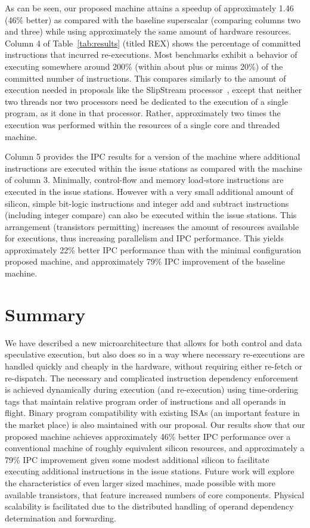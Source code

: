 \documentclass[10pt,twocolumn,dvips]{article}
\begin{document}
%
As can be seen, our proposed machine attains a speedup of approximately
1.46 (46\% better) as compared with the baseline superscalar 
(comparing columns two and three) 
while using approximately the same amount of hardware resources.
Column 4 of Table~\ref{tab:results} (titled REX) shows the percentage
of committed instructions that incurred re-executions.
Most benchmarks exhibit a behavior of executing somewhere around
200\% (within about plus or minus 20\%) of the committed
number of instructions.
This compares similarly to the amount of execution needed
in proposals like the SlipStream processor~\cite{ibrahim03},
except that neither two threads nor two processors need be
dedicated to the execution of a single program, as it done in
that processor. 
Rather, approximately two times the execution was performed
within the resources of a single core and threaded machine.

Column 5 provides the IPC results for a version of the
machine where additional instructions are executed within
the issue stations as compared with the machine of column 3.
Minimally, control-flow and memory load-store instructions
are executed in the issue stations.  
However with a very small additional amount of silicon,
simple bit-logic instructions and integer add and subtract
instructions (including integer compare) can also 
be executed within the issue stations.
This arrangement (transistors permitting) increases the
amount of resources available for executions, thus increasing
parallelism and IPC performance.
This yields approximately 22\% better IPC performance
than with the minimal configuration proposed machine, and approximately
79\% IPC improvement of the baseline machine.
%
%
\vspace{-0.15in}
\section{Summary}
%
We have described a new microarchitecture that
allows for both control and data speculative execution,
but also does so 
in a way where necessary re-executions are handled
quickly and cheaply in the hardware, without requiring either
re-fetch or re-dispatch.  
The necessary and complicated instruction dependency
enforcement is achieved dynamically during execution (and re-execution)
using time-ordering tags that maintain relative program order
of instructions and all operands in flight.
Binary program compatibility with existing ISAs (an important feature
in the market place) is also maintained with our proposal.
Our results show that our proposed machine achieves approximately
46\% better IPC performance over a conventional machine of roughly
equivalent silicon resources, and approximately a 79\%
IPC improvement given some modest additional silicon to facilitate
executing additional instructions in the issue stations.
Future work will explore the characteristics of even larger
sized machines, made possible with more available transistors,
that feature increased numbers of core components.
Physical scalability is facilitated due to the distributed
handling of operand dependency determination and forwarding.
%


%
\end{document}
